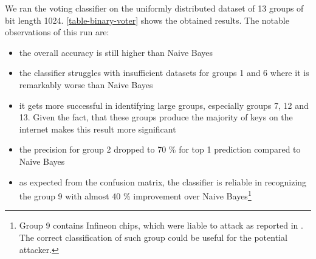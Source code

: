We ran the voting classifier on the uniformly distributed dataset of 13 groups of bit length 1024. \autoref{table-binary-voter} shows the obtained results. The notable observations of this run are:

\begin{itemize}

\item the overall accuracy is still higher than Naive Bayes

\item the classifier struggles with insufficient datasets for groups 1 and 6 where it is remarkably worse than Naive Bayes

\item it gets more successful in identifying large groups, especially groups 7, 12 and 13. Given the fact, that these groups produce the majority of keys on the internet makes this result more significant

\item the precision for group 2 dropped to 70 \% for top 1 prediction compared to Naive Bayes

\item as expected from the confusion matrix, the classifier is reliable in recognizing the group 9 with almost 40 \% improvement over Naive Bayes\footnote{Group 9 contains Infineon chips, which were liable to attack as reported in \cite{svenda_2}. The correct classification of such group could be useful for the potential attacker.}

\end{itemize}

